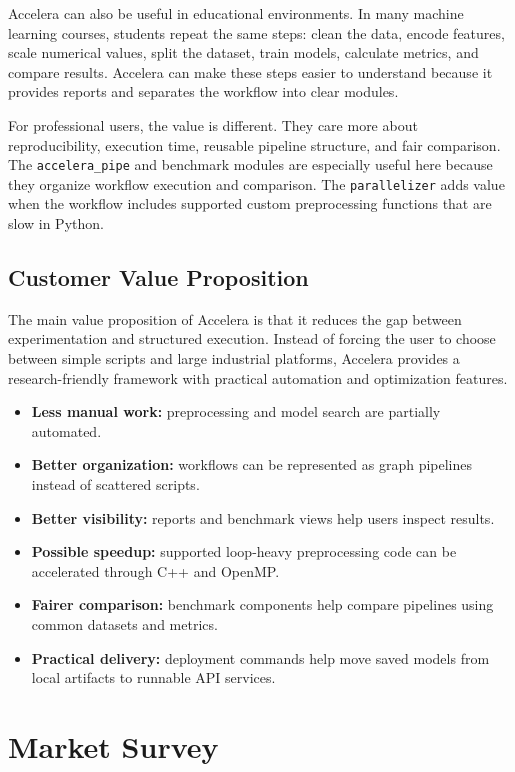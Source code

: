 \documentclass[12pt,a4paper]{report}
\begin{document}
\medskip
\noindent Accelera can also be useful in educational environments. In many machine
learning courses, students repeat the same steps: clean the data, encode
features, scale numerical values, split the dataset, train models, calculate
metrics, and compare results. Accelera can make these steps easier to understand
because it provides reports and separates the workflow into clear modules.

\medskip
\noindent For professional users, the value is different. They care more about
reproducibility, execution time, reusable pipeline structure, and fair
comparison. The \texttt{accelera\_pipe} and benchmark modules are especially
useful here because they organize workflow execution and comparison. The
\texttt{parallelizer} adds value when the workflow includes supported custom
preprocessing functions that are slow in Python.

\subsection*{Customer Value Proposition}

The main value proposition of Accelera is that it reduces the gap between
experimentation and structured execution. Instead of forcing the user to choose
between simple scripts and large industrial platforms, Accelera provides a
research-friendly framework with practical automation and optimization features.

\begin{itemize}
  \item \textbf{Less manual work:} preprocessing and model search are partially
  automated.
  \item \textbf{Better organization:} workflows can be represented as graph
  pipelines instead of scattered scripts.
  \item \textbf{Better visibility:} reports and benchmark views help users
  inspect results.
  \item \textbf{Possible speedup:} supported loop-heavy preprocessing code can be
  accelerated through C++ and OpenMP.
  \item \textbf{Fairer comparison:} benchmark components help compare pipelines
  using common datasets and metrics.
  \item \textbf{Practical delivery:} deployment commands help move saved models
  from local artifacts to runnable API services.
\end{itemize}

\section{Market Survey}
\end{document}
